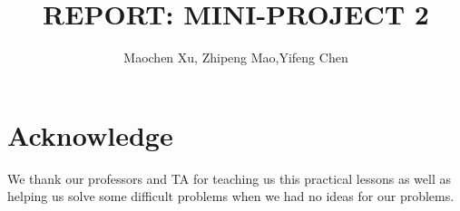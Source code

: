 \documentclass[10pt,journal,a4paper]{IEEEtran}
\begin{document}
%
\title{R{\LARGE EPORT}: M{\LARGE INI}-P{\LARGE ROJECT} 2}
%
% 
\author{Maochen Xu, Zhipeng Mao,Yifeng Chen}



\maketitle
\IEEEdisplaynotcompsoctitleabstractindextext










\section*{Acknowledge}
We thank our professors and TA for teaching us this practical lessons as well as helping us solve some difficult problems when we had no ideas for our problems.



\end{document}
